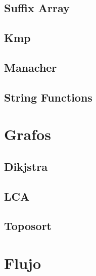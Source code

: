 \documentclass[a4paper,11pt,landscape,twocolumn]{article}
\begin{document}


\subsection{Suffix Array}



\subsection{Kmp}



\subsection{Manacher}



\subsection{String Functions}



\section{Grafos}

\subsection{Dikjstra}



\subsection{LCA}



\subsection{Toposort}



\section{Flujo}
\end{document}
